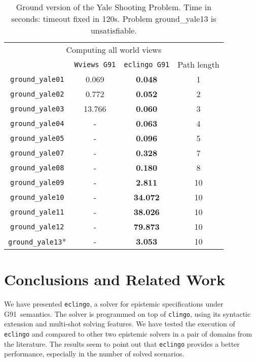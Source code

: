 \documentclass{new_tlp}
\def\eclingo{{\tt eclingo}}
\def\clingo{{\tt clingo}}
\begin{document}
\begin{table}[ht]
    \begin{tabular}{c|cc|c}
\cline{1-4}
\multicolumn{4}{c}{Computing all world views}             \\ \cline{1-4}
                   & \texttt{Wviews G91}   & \texttt{eclingo G91}  & Path length \\ \cline{1-4}
\texttt{ground\_yale01}  & 0.069     & \textbf{0.048}    & 1           \\
\texttt{ground\_yale02}  & 0.772     & \textbf{0.052}    & 2           \\
\texttt{ground\_yale03}  & 13.766    & \textbf{0.060}    & 3           \\
\texttt{ground\_yale04}  & -         & \textbf{0.063}    & 4           \\
\texttt{ground\_yale05}  & -         & \textbf{0.096}    & 5           \\
\texttt{ground\_yale07}  & -         & \textbf{0.328}    & 7           \\
\texttt{ground\_yale08}  & -         & \textbf{0.180}    & 8           \\
\texttt{ground\_yale09}  & -         & \textbf{2.811}    & 10          \\
\texttt{ground\_yale10}  & -         & \textbf{34.072}   & 10          \\
\texttt{ground\_yale11}  & -         & \textbf{38.026}   & 10          \\
\texttt{ground\_yale12}  & -         & \textbf{79.873}   & 10          \\
\texttt{ground\_yale13}* & -         & \textbf{3.053}    & 10          \\ \cline{1-4}
\end{tabular}
\setlength{\abovecaptionskip}{5pt}
\caption{Ground version of the Yale Shooting Problem. Time in seconds: timeout fixed in 120s. Problem ground\_yale13 is unsatisfiable.}
\label{tab:ground_yale}
\end{table}

\section{Conclusions and Related Work}
\label{sec:conc}

We have presented \eclingo{}, a solver for epistemic specifications under G91~semantics.
%
The solver is programmed on top of \clingo, using its syntactic extension and multi-shot solving features.
%
We have tested the execution of \eclingo{} and compared to other two epistemic solvers in a pair of domains from the literature.
%
The results seem to point out that \eclingo{} provides a better performance, especially in the number of solved scenarios.
\end{document}
